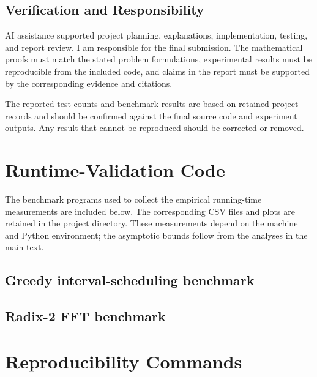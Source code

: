 \documentclass[conference]{IEEEtran}
\begin{document}
\subsection{Verification and Responsibility}

AI assistance supported project planning, explanations, implementation,
testing, and report review. I am responsible for the final submission.
The mathematical proofs must match the stated problem formulations,
experimental results must be reproducible from the included code,
and claims in the report must be supported by the corresponding
evidence and citations.

The reported test counts and benchmark results are based on retained
project records and should be confirmed against the final source code
and experiment outputs. Any result that cannot be reproduced should
be corrected or removed.

\appendices

\section{Runtime-Validation Code}

The benchmark programs used to collect the empirical running-time
measurements are included below. The corresponding CSV files and plots
are retained in the project directory. These measurements depend on the
machine and Python environment; the asymptotic bounds follow from the
analyses in the main text.

\subsection{Greedy interval-scheduling benchmark}


\subsection{Radix-2 FFT benchmark}


\newpage

\section{Reproducibility Commands}
\end{document}
